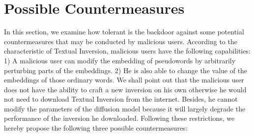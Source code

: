 
\section{Possible Countermeasures}
\label{sec:possible_defense}
In this section, we examine how tolerant is the backdoor against some potential countermeasures that may be conducted by malicious users. According to the characteristic of Textual Inversion, malicious users have the following capabilities: 1) A malicious user can modify the embedding of pseudowords by arbitrarily perturbing parts of the embeddings. 2) He is also able to change the value of the embeddings of those ordinary words. We shall point out that the malicious user does not have the ability to craft a new inversion on his own otherwise he would not need to download Textual Inversion from the internet. Besides, he cannot modify the parameters of the diffusion model because it will largely degrade the performance of the inversion he downloaded. Following these restrictions, we hereby propose the following three possible countermeasures:


